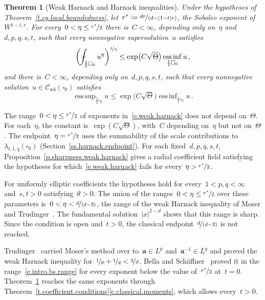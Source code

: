 \documentclass[11pt,letterpaper]{article}
\numberwithin{equation}{section}
\newtheorem{theoremA}{Theorem}
\theoremstyle{definition}
\renewcommand{\a}{\mathbf{a}}
\newcommand{\nf}{\nicefrac}
\newcommand{\cu}{\square}
\DeclareMathOperator*{\esssup}{ess\,sup}
\DeclareMathOperator*{\essinf}{ess\,inf}
\newcommand{\Csol}{\mathcal C_{\mathrm{sol}}}
\def\Xint#1{\mathchoice
	{\XXint\displaystyle\textstyle{#1}}%
	{\XXint\textstyle\scriptstyle{#1}}%
	{\XXint\scriptstyle\scriptscriptstyle{#1}}%
	{\XXint\scriptscriptstyle\scriptscriptstyle{#1}}%
	\!\int}
\def\XXint#1#2#3{{\setbox0=\hbox{$#1{#2#3}{\int}$}
		\vcenter{\hbox{$#2#3$}}\kern-.5\wd0}}
\def\fint{\Xint-}
\begin{document}
\begin{theoremA}[Weak Harnack and Harnack inequalities]
\label{t.harnack}
Under the hypotheses of Theorem~\ref{t.cg.local.boundedness}, let~$r^*\coloneqq\nf{dr}{(d-(1-t)r)}$, the Sobolev exponent of~$W^{1-t,r}$. For every~$0<\eta\leq\nf{r^*}2$ there is~$C<\infty$, depending only on~$\eta$ and~$d,p,q,s,t$, such that every nonnegative supersolution~$u$ satisfies
\begin{equation}
	\biggl(\fint_{\frac58\cu_0}u^\eta\biggr)^{\nf1\eta}\leq\exp\bigl(C\sqrt\Theta\bigr)\essinf_{\frac12\cu_0}u\,,
	\label{e.weak.harnack}
\end{equation}
and there is~$C<\infty$, depending only on~$d,p,q,s,t$, such that every nonnegative solution~$u\in\Csol(\cu_0)$ satisfies
\begin{equation}
	\esssup_{\frac12\cu_0}u\leq\exp\bigl(C\sqrt\Theta\bigr)\essinf_{\frac12\cu_0}u\,.
	\label{e.harnack}
\end{equation}
\end{theoremA}

The range~$0<\eta\leq\nf{r^*}2$ of exponents in~\eqref{e.weak.harnack} does not depend on~$\Theta$. For each~$\eta$, the constant is~$\exp(C\sqrt\Theta)$, with~$C$ depending on~$\eta$ but not on~$\Theta$. The endpoint~$\eta=\nf{r^*}2$ uses the summability of the scale contributions to~$\lambda_{t,1,q}(\cu_0)$ (Section~\ref{ss.harnack.endpoint}). For each fixed~$d,p,q,s,t$, Proposition~\ref{p.sharpness.weak.harnack} gives a radial coefficient field satisfying the hypotheses for which~\eqref{e.weak.harnack} fails for every~$\eta>\nf{r^*}2$.

For uniformly elliptic coefficients the hypotheses hold for every~$1<p,q<\infty$ and~$s,t>0$ satisfying~$\theta>0$. The union of the ranges~$0<\eta\leq\nf{r^*}2$ over these parameters is~$0<\eta<\nf d{(d-2)}$, the range of the weak Harnack inequality of Moser and Trudinger~\cite{Moser2,Trudinger.1967}. The fundamental solution~$|x|^{2-d}$ shows that this range is sharp. Since the condition is open and~$t>0$, the classical endpoint~$\nf d{(d-2)}$ is not reached.

Trudinger~\cite{Trudinger,Trudinger.1973} carried Moser's method over to~$\a\in L^p$ and~$\a^{-1}\in L^q$ and proved the weak Harnack inequality for~$\nf1p+\nf1q<\nf2d$. Bella and Sch\"affner~\cite{Bella.Schaffner.regularity} proved it in the range~\eqref{e.intro.bs.range} for every exponent below the value of~$\nf{r^*}2$ at~$t=0$. Theorem~\ref{t.harnack} reaches the same exponents through Theorem~\ref{t.coefficient.conditions}\ref{c.classical.moments}, which allows every~$t>0$.
\end{document}
